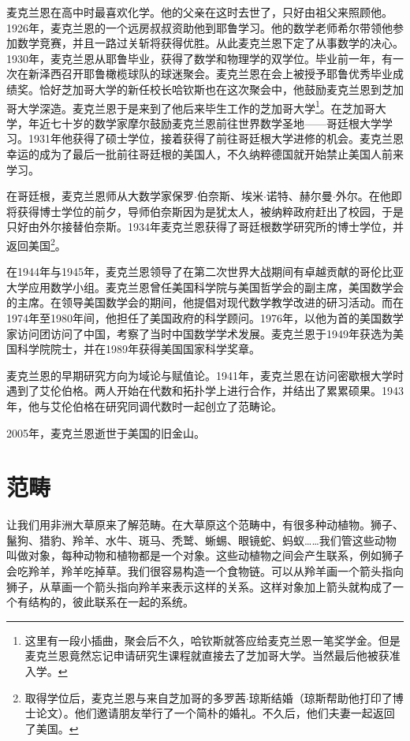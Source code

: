 \documentclass{article}
\begin{document}
麦克兰恩在高中时最喜欢化学。他的父亲在这时去世了，只好由祖父来照顾他。1926年，麦克兰恩的一个远房叔叔资助他到耶鲁学习。他的数学老师希尔带领他参加数学竞赛，并且一路过关斩将获得优胜。从此麦克兰恩下定了从事数学的决心。1930年，麦克兰恩从耶鲁毕业，获得了数学和物理学的双学位。毕业前一年，有一次在新泽西召开耶鲁橄榄球队的球迷聚会。麦克兰恩在会上被授予耶鲁优秀毕业成绩奖\cite{Wiki-Mac-Lane}。恰好芝加哥大学的新任校长哈钦斯也在这次聚会中，他鼓励麦克兰恩到芝加哥大学深造。麦克兰恩于是来到了他后来毕生工作的芝加哥大学\footnote{这里有一段小插曲，聚会后不久，哈钦斯就答应给麦克兰恩一笔奖学金。但是麦克兰恩竟然忘记申请研究生课程就直接去了芝加哥大学。当然最后他被获准入学。}。在芝加哥大学，年近七十岁的数学家摩尔鼓励麦克兰恩前往世界数学圣地——哥廷根大学学习。1931年他获得了硕士学位，接着获得了前往哥廷根大学进修的机会。麦克兰恩幸运的成为了最后一批前往哥廷根的美国人，不久纳粹德国就开始禁止美国人前来学习。

在哥廷根，麦克兰恩师从大数学家保罗$\cdot$伯奈斯、埃米$\cdot$诺特、赫尔曼$\cdot$外尔。在他即将获得博士学位的前夕，导师伯奈斯因为是犹太人，被纳粹政府赶出了校园，于是只好由外尔接替伯奈斯。1934年麦克兰恩获得了哥廷根数学研究所的博士学位，并返回美国\footnote{取得学位后，麦克兰恩与来自芝加哥的多罗茜$\cdot$琼斯结婚（琼斯帮助他打印了博士论文）。他们邀请朋友举行了一个简朴的婚礼。不久后，他们夫妻一起返回了美国。}。

在1944年与1945年，麦克兰恩领导了在第二次世界大战期间有卓越贡献的哥伦比亚大学应用数学小组。麦克兰恩曾任美国科学院与美国哲学会的副主席，美国数学会的主席。在领导美国数学会的期间，他提倡对现代数学教学改进的研习活动。而在1974年至1980年间，他担任了美国政府的科学顾问。1976年，以他为首的美国数学家访问团访问了中国，考察了当时中国数学学术发展。麦克兰恩于1949年获选为美国科学院院士，并在1989年获得美国国家科学奖章。

麦克兰恩的早期研究方向为域论与赋值论。1941年，麦克兰恩在访问密歇根大学时遇到了艾伦伯格。两人开始在代数和拓扑学上进行合作，并结出了累累硕果。1943年，他与艾伦伯格在研究同调代数时一起创立了范畴论。

2005年，麦克兰恩逝世于美国的旧金山。

\section{范畴}

让我们用非洲大草原来了解范畴。在大草原这个范畴中，有很多种动植物。狮子、鬣狗、猎豹、羚羊、水牛、斑马、秃鹫、蜥蜴、眼镜蛇、蚂蚁……我们管这些动物叫做对象，每种动物和植物都是一个对象。这些动植物之间会产生联系，例如狮子会吃羚羊，羚羊吃掉草。我们很容易构造一个食物链。可以从羚羊画一个箭头指向狮子，从草画一个箭头指向羚羊来表示这样的关系。这样对象加上箭头就构成了一个有结构的，彼此联系在一起的系统。
\end{document}
